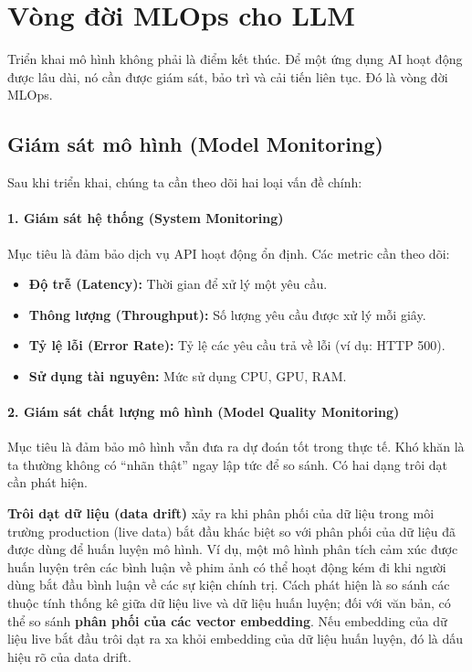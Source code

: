 
\section{Vòng đời MLOps cho LLM}
\label{sec:llmops_lifecycle}
Triển khai mô hình không phải là điểm kết thúc. Để một ứng dụng AI hoạt động được lâu dài, nó cần được giám sát, bảo trì và cải tiến liên tục. Đó là vòng đời MLOps.

\subsection{Giám sát mô hình (Model Monitoring)}
\label{ssec:model_monitoring}
Sau khi triển khai, chúng ta cần theo dõi hai loại vấn đề chính:

\paragraph{1. Giám sát hệ thống (System Monitoring)}
Mục tiêu là đảm bảo dịch vụ API hoạt động ổn định. Các metric cần theo dõi:
\begin{itemize}
    \item \textbf{Độ trễ (Latency):} Thời gian để xử lý một yêu cầu.
    \item \textbf{Thông lượng (Throughput):} Số lượng yêu cầu được xử lý mỗi giây.
    \item \textbf{Tỷ lệ lỗi (Error Rate):} Tỷ lệ các yêu cầu trả về lỗi (ví dụ: HTTP 500).
    \item \textbf{Sử dụng tài nguyên:} Mức sử dụng CPU, GPU, RAM.
\end{itemize}

\paragraph{2. Giám sát chất lượng mô hình (Model Quality Monitoring)}
Mục tiêu là đảm bảo mô hình vẫn đưa ra dự đoán tốt trong thực tế. Khó khăn là ta thường không có “nhãn thật” ngay lập tức để so sánh. Có hai dạng trôi dạt cần phát hiện.

\textbf{Trôi dạt dữ liệu (data drift)} xảy ra khi phân phối của dữ liệu trong môi trường production (live data) bắt đầu khác biệt so với phân phối của dữ liệu đã được dùng để huấn luyện mô hình. Ví dụ, một mô hình phân tích cảm xúc được huấn luyện trên các bình luận về phim ảnh có thể hoạt động kém đi khi người dùng bắt đầu bình luận về các sự kiện chính trị. Cách phát hiện là so sánh các thuộc tính thống kê giữa dữ liệu live và dữ liệu huấn luyện; đối với văn bản, có thể so sánh \textbf{phân phối của các vector embedding}. Nếu embedding của dữ liệu live bắt đầu trôi dạt ra xa khỏi embedding của dữ liệu huấn luyện, đó là dấu hiệu rõ của data drift.

